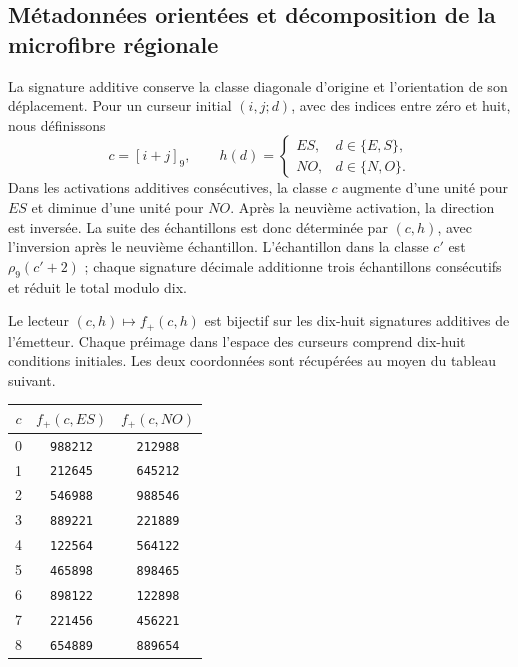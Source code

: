 \subsection{Métadonnées orientées et décomposition de la microfibre régionale}
\label{sec:microfibra-bipartita-explicita}

La signature additive conserve la classe diagonale d'origine et l'orientation
de son déplacement. Pour un curseur initial $(i,j;d)$, avec des indices entre
zéro et huit, nous définissons
\[
 c=[i+j]_9,\qquad
 h(d)=\begin{cases}ES,&d\in\{E,S\},\\NO,&d\in\{N,O\}.
 \end{cases}
\]
Dans les activations additives consécutives, la classe $c$ augmente d'une unité
pour $ES$ et diminue d'une unité pour $NO$. Après la neuvième activation, la
direction est inversée. La suite des échantillons est donc déterminée
par $(c,h)$, avec l'inversion après le neuvième échantillon. L'échantillon
dans la classe $c'$ est $\rho_9(c'+2)$ ; chaque signature décimale additionne trois échantillons
consécutifs et réduit le total modulo dix.

\begin{proposition}
Le lecteur $(c,h)\mapsto f_+(c,h)$ est bijectif sur les dix-huit
signatures additives de l'émetteur. Chaque préimage dans l'espace des curseurs
comprend dix-huit conditions initiales. Les deux coordonnées sont
récupérées au moyen du tableau suivant.
\end{proposition}

\begin{center}
\begin{tabular}{c|cc}
\toprule
$c$&$f_+(c,ES)$&$f_+(c,NO)$\\
\midrule
0&\texttt{988212}&\texttt{212988}\\
1&\texttt{212645}&\texttt{645212}\\
2&\texttt{546988}&\texttt{988546}\\
3&\texttt{889221}&\texttt{221889}\\
4&\texttt{122564}&\texttt{564122}\\
5&\texttt{465898}&\texttt{898465}\\
6&\texttt{898122}&\texttt{122898}\\
7&\texttt{221456}&\texttt{456221}\\
8&\texttt{654889}&\texttt{889654}\\
\bottomrule
\end{tabular}
\end{center}

